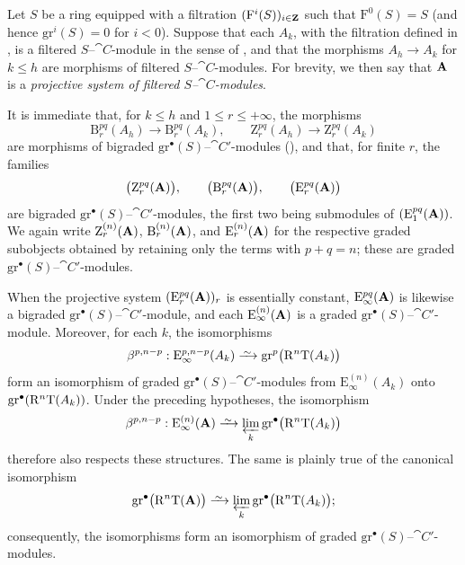 \begin{env}[13.7.6]
\label{0.13.7.6}
Let $S$ be a ring equipped with a filtration
$(\mathrm{F}^i(S))_{i\in\mathbf{Z}}$ such that
$\mathrm{F}^0(S)=S$ (and hence
$\mathrm{gr}^i(S)=0$ for $i<0$).
Suppose that each $A_k$, with the filtration defined in
, is a filtered
$S$--$\cat{C}$-module in the sense of , and that the
morphisms $A_h\longrightarrow A_k$ for $k\leq h$ are morphisms of
filtered $S$--$\cat{C}$-modules.
For brevity, we then say that $\mathbf{A}$ is a
\emph{projective system of filtered $S$--$\cat{C}$-modules}.

It is immediate that, for $k\leq h$ and
$1\leq r\leq+\infty$, the morphisms
\[
  \mathrm{B}_r^{pq}(A_h)\longrightarrow\mathrm{B}_r^{pq}(A_k),
  \qquad
  \mathrm{Z}_r^{pq}(A_h)\longrightarrow\mathrm{Z}_r^{pq}(A_k)
\]
are morphisms of bigraded
$\mathrm{gr}^\bullet(S)$--$\cat{C}'$-modules
(), and that, for finite $r$, the families
\[
  \bigl(\mathrm{Z}_r^{pq}(\mathbf{A})\bigr),\qquad
  \bigl(\mathrm{B}_r^{pq}(\mathbf{A})\bigr),\qquad
  \bigl(\mathrm{E}_r^{pq}(\mathbf{A})\bigr)
\]
are bigraded
$\mathrm{gr}^\bullet(S)$--$\cat{C}'$-modules, the first two being
submodules of $(\mathrm{E}_1^{pq}(\mathbf{A}))$.
We again write
$\mathrm{Z}_r^{(n)}(\mathbf{A})$,
$\mathrm{B}_r^{(n)}(\mathbf{A})$, and
$\mathrm{E}_r^{(n)}(\mathbf{A})$ for the respective graded subobjects
obtained by retaining only the terms with $p+q=n$; these are graded
$\mathrm{gr}^\bullet(S)$--$\cat{C}'$-modules.

When the projective system
$(\mathrm{E}_r^{pq}(\mathbf{A}))_r$ is essentially constant,
$\mathrm{E}_\infty^{pq}(\mathbf{A})$ is likewise a bigraded
$\mathrm{gr}^\bullet(S)$--$\cat{C}'$-module, and each
$\mathrm{E}_\infty^{(n)}(\mathbf{A})$ is a graded
$\mathrm{gr}^\bullet(S)$--$\cat{C}'$-module.
Moreover, for each $k$, the isomorphisms
\[
  \beta^{p,n-p}:
  \mathrm{E}_\infty^{p,n-p}(A_k)
  \isoto
  \mathrm{gr}^p\bigl(\RR^n\mathrm{T}(A_k)\bigr)
\]
form an isomorphism of graded
$\mathrm{gr}^\bullet(S)$--$\cat{C}'$-modules from
$\mathrm{E}_\infty^{(n)}(A_k)$ onto
$\mathrm{gr}^\bullet(\mathrm{R}^n\mathrm{T}(A_k))$.
Under the preceding hypotheses, the isomorphism
\[
  \beta^{p,n-p}:
  \mathrm{E}_\infty^{(n)}(\bb{A})
  \isoto
  \varprojlim_k
  \mathrm{gr}^\bullet\bigl(\RR^n\mathrm{T}(A_k)\bigr)
\]
therefore also respects these structures.
The same is plainly true of the canonical isomorphism
\[
  \mathrm{gr}^\bullet\bigl(\RR^n\mathrm{T}(\bb{A})\bigr)
  \isoto
  \varprojlim_k
  \mathrm{gr}^\bullet\bigl(\RR^n\mathrm{T}(A_k)\bigr);
\]
consequently, the isomorphisms  form an
isomorphism of graded
$\mathrm{gr}^\bullet(S)$--$\cat{C}'$-modules.
\end{env}

